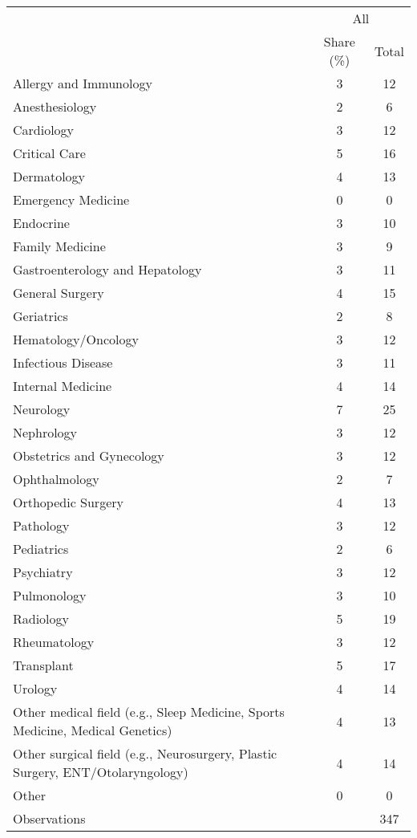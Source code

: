 \begin{tabular}{l*{1}{cc}}
\toprule
                &\multicolumn{2}{c}{All}\\
                &Share (\%)&    Total\\
\midrule
Allergy and Immunology&        3&       12\\
Anesthesiology  &        2&        6\\
Cardiology      &        3&       12\\
Critical Care   &        5&       16\\
Dermatology     &        4&       13\\
Emergency Medicine&        0&        0\\
Endocrine       &        3&       10\\
Family Medicine &        3&        9\\
Gastroenterology and Hepatology&        3&       11\\
General Surgery &        4&       15\\
Geriatrics      &        2&        8\\
Hematology/Oncology&        3&       12\\
Infectious Disease&        3&       11\\
Internal Medicine&        4&       14\\
Neurology       &        7&       25\\
Nephrology      &        3&       12\\
Obstetrics and Gynecology&        3&       12\\
Ophthalmology   &        2&        7\\
Orthopedic Surgery&        4&       13\\
Pathology       &        3&       12\\
Pediatrics      &        2&        6\\
Psychiatry      &        3&       12\\
Pulmonology     &        3&       10\\
Radiology       &        5&       19\\
Rheumatology    &        3&       12\\
Transplant      &        5&       17\\
Urology         &        4&       14\\
Other medical field (e.g., Sleep Medicine, Sports Medicine, Medical Genetics)&        4&       13\\
Other surgical field (e.g., Neurosurgery, Plastic Surgery, ENT/Otolaryngology)&        4&       14\\
Other           &        0&        0\\
\midrule Observations & & 347 \\ \bottomrule \end{tabular}
